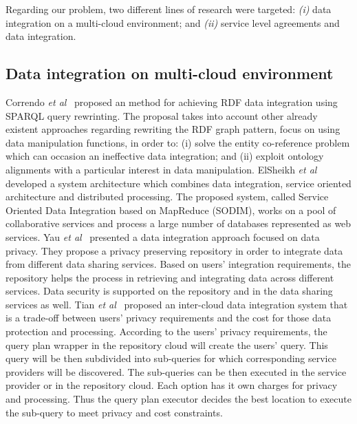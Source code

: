 Regarding our problem, two different lines of research were targeted:
\textit{(i)} data integration on a multi-cloud environment; and
\textit{(ii)} service level agreements and data integration.

\subsection{Data integration on multi-cloud environment}
Correndo \textit{et al}~\cite{075} proposed an method for achieving RDF data integration
using SPARQL query rewrinting. 
The proposal takes into account other already existent approaches regarding rewriting 
the RDF graph pattern, focus on using data manipulation functions, in order to: (i) solve 
the entity co-reference problem which can occasion an ineffective data integration; 
and (ii) exploit ontology alignments with a particular interest in data manipulation. 
ElSheikh \textit{et al}~\cite{078} developed a system architecture which combines data integration,
service oriented architecture and distributed processing. The proposed system, called Service 
Oriented Data Integration based on MapReduce (SODIM), works on a pool of collaborative services and 
process a large number of databases represented as web services. 
Yau \textit{et al}~\cite{YauY08} presented a data integration approach focused on data privacy.
They propose a privacy preserving repository in order to integrate data from
different data sharing services. 
Based on users' integration requirements, the repository helps the process in retrieving and integrating
data across different services. Data security is supported on the repository and in the data sharing services as well.
Tian \textit{et al}~\cite{096} proposed an inter-cloud data integration system that is a trade-off between users' privacy requirements and the cost for those data protection and processing.
According to the users' privacy requirements, the query plan wrapper in the repository cloud will
create the users' query. This query will be then subdivided into sub-queries for
which corresponding service providers will be discovered. The sub-queries can
be then executed in the service provider or in the repository cloud.
Each option has it own charges for privacy and processing. 
Thus the query plan executor decides the best location to execute the sub-query
to meet privacy and cost constraints.

